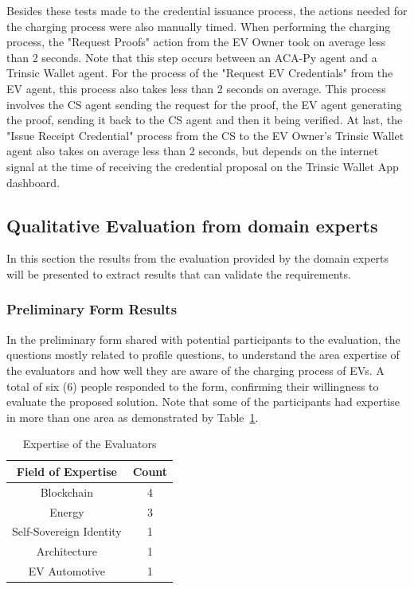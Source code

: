 Besides these tests made to the credential issuance process, the actions needed for the charging process were also manually timed. 
When performing the charging process, the "Request Proofs" action from the EV Owner took on average less than 2 seconds. Note that this step occurs between an ACA-Py agent and a Trinsic Wallet agent.
For the process of the "Request EV Credentials" from the EV agent, this process also takes less than 2 seconds on average. This process involves the CS agent sending the request for the proof, the EV agent generating the proof, sending it back to the CS agent and then it being verified. 
At last, the "Issue Receipt Credential" process from the CS to the EV Owner's Trinsic Wallet agent also takes on average less than 2 seconds, but depends on the internet signal at the time of receiving the credential proposal on the Trinsic Wallet App dashboard.

\subsection{Qualitative Evaluation from domain experts}
\label{subsec:qualitative_evaluatin_from_domain_experts}

In this section the results from the evaluation provided by the domain experts will be presented to extract results that can validate the requirements.

\subsubsection{Preliminary Form Results}
\label{subsubsec:preliminary_form}

In the preliminary form shared with potential participants to the evaluation, the questions mostly related to profile questions, to understand the area expertise of the evaluators and how well they are aware of the charging process of EVs.
A total of six (6) people responded to the form, confirming their willingness to evaluate the proposed solution. Note that some of the participants had expertise in more than one area as demonstrated by Table~\ref{tab:expertise_of_evaluators}.

\begin{table}[!htb]
    \centering
    \begin{tabular}{|cc|}
    \hline
    Field of Expertise & Count \\
    \hline
    Blockchain & 4 \\
    Energy & 3 \\
    Self-Sovereign Identity & 1 \\
    Architecture & 1 \\
    EV Automotive & 1 \\
    \hline
    \end{tabular}
    \caption{Expertise of the Evaluators}
    \label{tab:expertise_of_evaluators}
\end{table}

